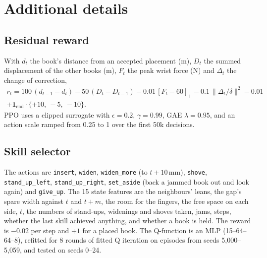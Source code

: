\documentclass{article}
\begin{document}
\section{Additional details}
\label{app:details}

\subsection{Residual reward}
With $d_t$ the book's distance from an accepted placement (m), $D_t$ the summed
displacement of the other books (m), $F_t$ the peak wrist force (N) and $\Delta_t$ the change of correction,
\begin{multline*}
r_t = 100\,(d_{t-1} - d_t) - 50\,(D_t - D_{t-1}) - 0.01\,[F_t - 60]_+ - 0.1\,\|\Delta_t / \delta\|^2 - 0.01 \\
+ \mathbf{1}_{\text{end}} \cdot \{+10,\ -5,\ -10\}.
\end{multline*}
PPO uses a clipped surrogate with $\epsilon = 0.2$, $\gamma = 0.99$, GAE $\lambda = 0.95$, and an action scale
ramped from 0.25 to 1 over the first 50k decisions.

\subsection{Skill selector}
The actions are \texttt{insert}, \texttt{widen}, \texttt{widen\_more} (to $t +
10$\,mm), \texttt{shove}, \texttt{stand\_up\_left}, \texttt{stand\_up\_right}, \texttt{set\_aside} (back a
jammed book out and look again) and \texttt{give\_up}. The 15 state features are the neighbours' leans, the
gap's spare width against $t$ and $t + m$, the room for the fingers, the free space on each side, $t$, the
numbers of stand-ups, widenings and shoves taken, jams, steps, whether the last skill achieved anything, and whether a book is
held. The reward is $-0.02$ per step and $+1$ for a placed book. The Q-function is an MLP (15--64--64--8), refitted for 8
rounds of fitted Q iteration on episodes from seeds 5{,}000--5{,}059, and tested on seeds 0--24.
\end{document}
